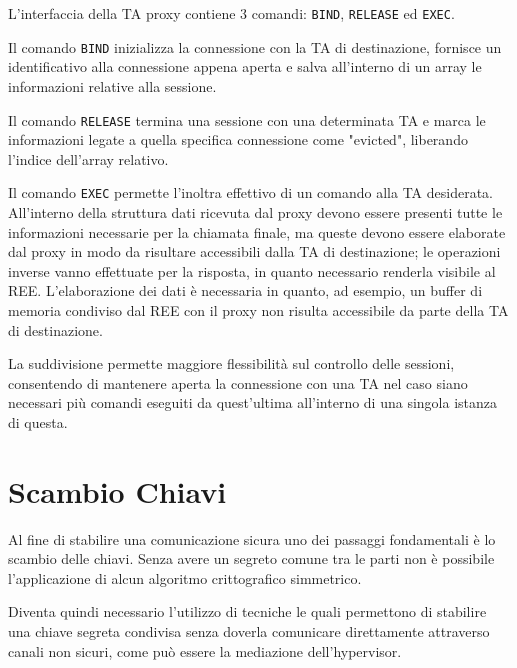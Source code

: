 \documentclass[12pt,italian]{report}
\begin{document}
	L'interfaccia della TA proxy contiene 3 comandi: \texttt{BIND}, \texttt{RELEASE} ed \texttt{EXEC}.
	
	Il comando \texttt{BIND} inizializza la connessione con la TA di destinazione, fornisce un identificativo alla connessione appena aperta e salva all'interno di un array le informazioni relative alla sessione.
	
	Il comando \texttt{RELEASE} termina una sessione con una determinata TA e marca le informazioni legate a quella specifica connessione come "evicted", liberando l'indice dell'array relativo.  
	
	Il comando \texttt{EXEC} permette l'inoltra effettivo di un comando alla TA desiderata. All'interno della struttura dati ricevuta dal proxy devono essere presenti tutte le informazioni necessarie per la chiamata finale, ma queste devono essere elaborate dal proxy in modo da risultare accessibili dalla TA di destinazione; le operazioni inverse vanno effettuate per la risposta, in quanto necessario renderla visibile al REE. L'elaborazione dei dati è necessaria in quanto, ad esempio, un buffer di memoria condiviso dal REE con il proxy non risulta accessibile da parte della TA di destinazione. 
	
	La suddivisione permette maggiore flessibilità sul controllo delle sessioni, consentendo di mantenere aperta la connessione con una TA nel caso siano necessari più comandi eseguiti da quest'ultima all'interno di una singola istanza di questa.
	
	
	
	\newpage
	
	\section{Scambio Chiavi}
	\label{sec:scambio_chiavi}
	Al fine di stabilire una comunicazione sicura uno dei passaggi fondamentali è lo scambio delle chiavi. Senza avere un segreto comune tra le parti non è possibile l'applicazione di alcun algoritmo crittografico simmetrico.
	
	Diventa quindi necessario l'utilizzo di tecniche le quali permettono di stabilire una chiave segreta condivisa senza doverla comunicare direttamente attraverso canali non sicuri, come può essere la mediazione dell'hypervisor.
	
\end{document}
